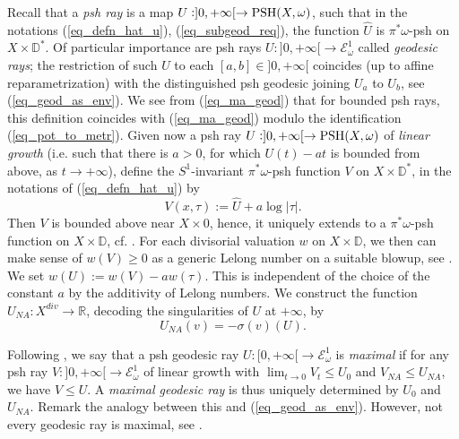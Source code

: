 \documentclass[12pt]{article}
\numberwithin{equation}{section}
\theoremstyle{theorem}
\theoremstyle{definition}
\theoremstyle{remark}
\newcommand{\real}{\mathbb{R}}
\begin{document}
	\par 
	Recall that a \textit{psh ray} is a map $U : ]0, + \infty[ \to {\rm{PSH}}(X, \omega)$, such that in the notations (\ref{eq_defn_hat_u}), (\ref{eq_subgeod_req}), the function $\hat{U}$ is $\pi^* \omega$-psh on $X \times \mathbb{D}^*$.
	Of particular importance are psh rays $U : ]0, +\infty[ \to \mathcal{E}_{\omega}^1$ called \textit{geodesic rays}; the restriction of such $U$ to each $[a, b] \in ]0, +\infty[$ coincides (up to affine reparametrization) with the distinguished psh geodesic joining $U_a$ to $U_b$, see (\ref{eq_geod_as_env}).
	We see from (\ref{eq_ma_geod}) that for bounded psh rays, this definition coincides with (\ref{eq_ma_geod}) modulo the identification (\ref{eq_pot_to_metr}).
	Given now a psh ray $U : ]0, + \infty[ \to {\rm{PSH}}(X, \omega)$ of \textit{linear growth} (i.e. such that there is $a > 0$, for which $U(t) - at$ is bounded from above, as $t \to + \infty$), define the $S^1$-invariant $\pi^* \omega$-psh function $V$ on $X \times \mathbb{D}^*$, in the notations of (\ref{eq_defn_hat_u}) by
	\begin{equation}
		V (x, \tau) := \hat{U} + a \log |\tau|.
	\end{equation}
	Then $V$ is bounded above near $X \times {0}$, hence, it uniquely extends to a $\pi^* \omega$-psh function on $X \times \mathbb{D}$, cf. \cite[Theorem I.5.23]{DemCompl}. 
 	For each divisorial valuation $w$ on $X \times \mathbb{D}$, we then can make sense of $w(V) \geq 0$ as a generic Lelong number on a suitable blowup, see \cite[\S B.6]{BerBouckJonYTD}.
 	We set $w(U) := w(V) - aw(\tau)$. 
 	This is independent of the choice of the constant $a$ by the additivity of Lelong numbers.
 	We construct the function $U_{NA} : X^{div} \to \real$, decoding the singularities of $U$ at $+ \infty$, by
 	\begin{equation}
 		U_{NA}(v) = - \sigma(v)(U).
 	\end{equation}
 	\par 
	Following \cite[Definition 6.5]{BerBouckJonYTD}, we say that a psh geodesic ray $U : [0, + \infty[ \to \mathcal{E}_{\omega}^1$ is \textit{maximal} if for any psh ray $V : ]0, + \infty[ \to \mathcal{E}_{\omega}^1$ of linear growth with $\lim_{t \to 0} V_t \leq U_0$ and $V_{NA} \leq U_{NA}$, we have $V \leq U$.
 	A \textit{maximal geodesic ray} is thus uniquely determined by $U_0$ and $U_{NA}$.
 	Remark the analogy between this and (\ref{eq_geod_as_env}).
 	However, not every geodesic ray is maximal, see \cite[Example 6.10]{BerBouckJonYTD}.
	\par 
\end{document}
